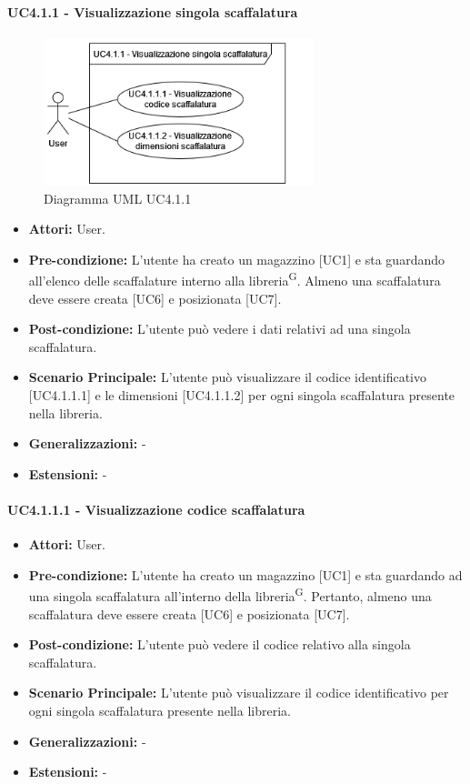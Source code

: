 \paragraph{UC4.1.1 - Visualizzazione singola scaffalatura}
\begin{figure}[H]
  \centering
  \includegraphics[width=0.7\textwidth]{UC_diagrams_1-10/UC4.1.1.drawio.png}
   \caption{Diagramma UML UC4.1.1}
\end{figure}
\begin{itemize}
    \item \textbf{Attori:} User.
    \item \textbf{Pre-condizione:} L'utente ha creato un magazzino [UC1] e sta guardando all'elenco delle scaffalature interno alla libreria\textsuperscript{G}. Almeno una scaffalatura deve essere creata [UC6] e posizionata [UC7].
    \item \textbf{Post-condizione:} L'utente può vedere i dati relativi ad una singola scaffalatura.
    \item \textbf{Scenario Principale:} L'utente può visualizzare il codice identificativo [UC4.1.1.1] e le dimensioni [UC4.1.1.2] per ogni singola scaffalatura presente nella libreria.
    \item \textbf{Generalizzazioni:} -
    \item \textbf{Estensioni:} -
\end{itemize}


\paragraph{UC4.1.1.1 - Visualizzazione codice scaffalatura}
\begin{itemize}
    \item \textbf{Attori:} User.
    \item \textbf{Pre-condizione:} L'utente ha creato un magazzino [UC1] e sta guardando ad una singola scaffalatura all'interno della libreria\textsuperscript{G}. Pertanto, almeno una scaffalatura deve essere creata [UC6] e posizionata [UC7].
    \item \textbf{Post-condizione:} L'utente può vedere il codice relativo alla singola scaffalatura.
    \item \textbf{Scenario Principale:} L'utente può visualizzare il codice identificativo per ogni singola scaffalatura presente nella libreria.
    \item \textbf{Generalizzazioni:} -
    \item \textbf{Estensioni:} -
\end{itemize}


